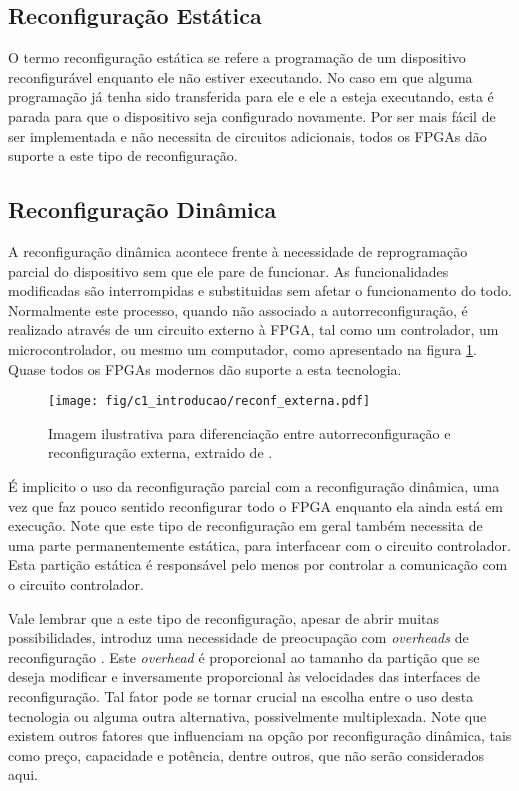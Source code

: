 \documentclass[11pt,a4paper,oneside]{book}
\begin{document}
\subsection{Reconfigura\c{c}\~ao Est\'atica}
\label{sss:estatica}
O termo reconfigura\c{c}\~ao est\'atica se refere a programa\c{c}\~ao de um dispositivo reconfigur\'avel enquanto ele n\~ao estiver executando.
No caso em que alguma programa\c{c}\~ao j\'a tenha sido transferida para ele e ele a esteja executando, esta \'e parada para que o dispositivo seja configurado novamente.
Por ser mais f\'acil de ser implementada e n\~ao necessita de circuitos adicionais, todos os FPGAs d\~ao suporte a este tipo de reconfigura\c{c}\~ao.

\subsection{Reconfigura\c{c}\~ao Din\^amica}
\label{sss:dinamica}
A reconfigura\c{c}\~ao din\^amica acontece frente \`a necessidade de reprograma\c{c}\~ao parcial do dispositivo sem que ele pare de funcionar.
As funcionalidades modificadas s\~ao interrompidas e substituidas sem afetar o funcionamento do todo.
Normalmente este processo, quando n\~ao associado a autorreconfigura\c{c}\~ao, \'e realizado atrav\'es de um circuito externo à FPGA, tal como um controlador, um microcontrolador, ou mesmo um computador, como apresentado na figura \ref{fig:rexterna}.
Quase todos os FPGAs modernos d\~ao suporte a esta tecnologia.

\begin{figure}[htp]
\centering
\texttt{[image: fig/c1\_introducao/reconf\_externa.pdf]}
\caption{Imagem ilustrativa para diferenciação entre autorreconfiguração e reconfiguração externa, extraido de \cite{wp374}.}
\label{fig:rexterna}
\end{figure}

É implicito o uso da reconfiguração parcial com a reconfiguração dinâmica, uma vez que faz pouco sentido reconfigurar todo o FPGA enquanto ela ainda está em execução.
Note que este tipo de reconfiguração em geral também necessita de uma parte permanentemente est\'atica, para interfacear com o circuito controlador.
Esta parti\c{c}\~ao est\'atica \'e respons\'avel pelo menos por controlar a comunica\c{c}\~ao com o circuito controlador.

Vale lembrar que a este tipo de reconfiguração, apesar de abrir muitas possibilidades, introduz uma necessidade de preocupação com \textit{overheads} de reconfiguração \cite{Hauck2007}.
Este \textit{overhead} é proporcional ao tamanho da partição que se deseja modificar e inversamente proporcional às velocidades das interfaces de reconfiguração.
Tal fator pode se tornar crucial na escolha entre o uso desta tecnologia ou alguma outra alternativa, possivelmente multiplexada.
Note que existem outros fatores que influenciam na opção por reconfiguração dinâmica, tais como preço, capacidade e potência, dentre outros, que não serão considerados aqui.
\end{document}
